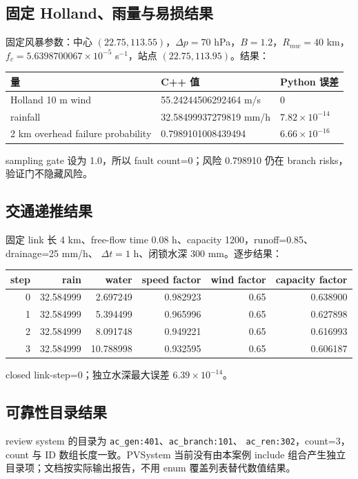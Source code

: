 \subsection{固定 Holland、雨量与易损结果}
固定风暴参数：中心 $(22.75,113.55)$，$\Delta p=70$ hPa，$B=1.2$，$R_{mw}=40$ km，
$f_c=5.6398700067\times10^{-5}$ s$^{-1}$，站点 $(22.75,113.95)$。结果：
\begin{center}\small
\begin{tabular}{@{}L{6.4cm}L{4.8cm}L{3.0cm}@{}}
\toprule
量 & C++ 值 & Python 误差\\
\midrule
Holland 10 m wind & 55.24244506292464 m/s & 0\\
rainfall & 32.58499937279819 mm/h & $7.82\times10^{-14}$\\
2 km overhead failure probability & 0.7989101008439494 & $6.66\times10^{-16}$\\
\bottomrule
\end{tabular}
\end{center}
sampling gate 设为 1.0，所以 fault count=0；风险 0.798910 仍在 branch risks，验证门不隐藏风险。

\subsection{交通递推结果}
固定 link 长 4 km、free-flow time 0.08 h、capacity 1200，runoff=0.85、drainage=25 mm/h、
$\Delta t=1$ h、闭锁水深 300 mm。逐步结果：
\begin{center}\small
\begin{tabular}{@{}rrrrrr@{}}
\toprule
step & rain & water & speed factor & wind factor & capacity factor\\
\midrule
0 & 32.584999 & 2.697249 & 0.982923 & 0.65 & 0.638900\\
1 & 32.584999 & 5.394499 & 0.965996 & 0.65 & 0.627898\\
2 & 32.584999 & 8.091748 & 0.949221 & 0.65 & 0.616993\\
3 & 32.584999 & 10.788998 & 0.932595 & 0.65 & 0.606187\\
\bottomrule
\end{tabular}
\end{center}
closed link-step=0；独立水深最大误差 $6.39\times10^{-14}$。

\subsection{可靠性目录结果}
review system 的目录为 \texttt{ac\_gen:401}、\texttt{ac\_branch:101}、
\texttt{ac\_ren:302}，count=3，count 与 ID 数组长度一致。PVSystem 当前没有由本案例 include
组合产生独立目录项；文档按实际输出报告，不用 enum 覆盖列表替代数值结果。

